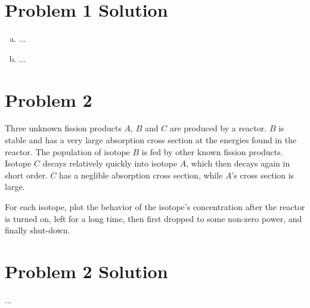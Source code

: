 \documentclass{report}
\begin{document}
\section*{Problem 1 Solution}

\begin{enumerate}[a)]

\item ...

\item ...

\end{enumerate}



\newpage
\section*{Problem 2}

Three unknown fission products $A$, $B$ and $C$ are produced by a reactor. $B$ is stable and has a very large absorption cross section at the energies found in the reactor. The population of isotope $B$ is fed by other known fission products. Isotope $C$ decays relatively quickly into isotope $A$, which then decays again in short order. $C$ has a neglible absorption cross section, while $A$'s cross section is large. 

For each isotope, plot the behavior of the isotope's concentration after the reactor is turned on, left for a long time, then first dropped to some non-zero power, and finally shut-down.



\section*{Problem 2 Solution}

...
\end{document}
